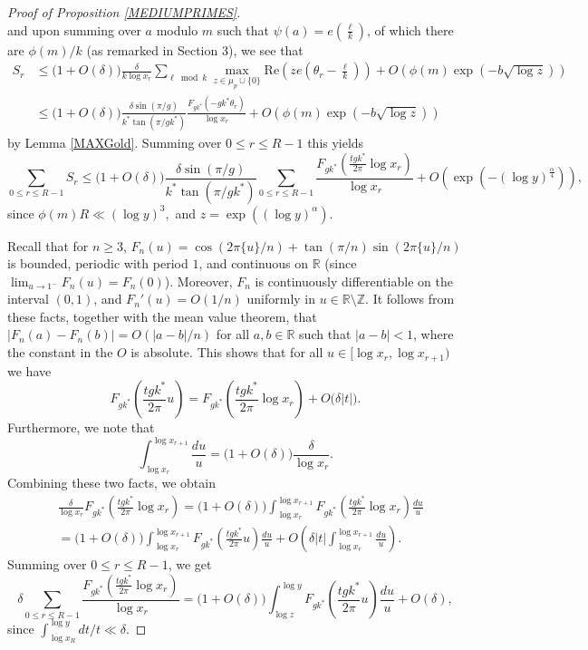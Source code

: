 \documentclass[12pt]{amsart}
\theoremstyle{definition}
\numberwithin{equation}{section}
\begin{document}
\begin{proof}[Proof of Proposition \ref{MEDIUMPRIMES}]
\begin{equation*}
\end{equation*}
and upon summing over $a$ modulo $m$ such that $\psi(a) = e\left(\frac{\ell}{k}\right)$, of which there are $\phi(m)/k$ (as remarked in Section 3), we see that
\begin{align*}
S_r &\leq \big(1+O(\delta)\big)\frac{\delta}{k\log x_r}\sum_{\ell \bmod k} \max_{z \in \mu_p \cup \{0\}} \text{Re}\left(ze\left(\theta_r-\frac{\ell}{k}\right)\right) + O\left(\phi(m)\exp\left(-b\sqrt{\log z}\right)\right)\\
& \leq \big(1+O(\delta)\big)\frac{\delta \sin(\pi/g)}{ k^{\ast}\tan(\pi/gk^{\ast})}\frac{F_{gk^{\ast}}(-gk^{\ast} \theta_r)}{\log x_r}+ O\left(\phi(m)\exp\left(-b\sqrt{\log z}\right)\right)
\end{align*} 
by Lemma \ref{MAXGold}. Summing over $0 \leq r \leq R-1$ this yields
\begin{equation}\label{SPLIT2}
\sum_{0 \leq r \leq R-1} S_r \leq\big(1+O(\delta)\big)\frac{\delta \sin(\pi/g)}{ k^{\ast}\tan(\pi/gk^{\ast})} \sum_{0 \leq r \leq R-1} \frac{F_{gk^{\ast}}\left(\frac{t gk^{\ast}}{2\pi} \log x_r\right)}{\log x_r} +  O\left(\exp\left(-(\log y)^{\frac{\alpha}{4}}\right)\right),
\end{equation} 
since $\phi(m) R\ll (\log y)^3,$ and $z=\exp\left((\log y)^{\alpha}\right).$ 

Recall that for $n\ge 3$, $F_n(u)= \cos(2\pi\{u\}/n) + \tan(\pi/n)\sin(2\pi \{u\}/n)$ is bounded, periodic with period $1$, and continuous on $\mathbb{R}$ (since $\lim_{u\to 1^{-}} F_n(u)=F_n(0)$). Moreover, $F_n$ is continuously differentiable on the interval $(0,1)$, and $F_n'(u) =O(1/n)$ uniformly in $u\in \mathbb{R}\setminus\mathbb{Z}$. It follows from  these facts, together with the mean value theorem, that $|F_n(a)-F_n(b)|=O(|a-b|/n)$ for all $a, b\in \mathbb{R}$ such that $|a-b|<1$, where the constant in the $O$ is absolute. This shows that for all $u\in [\log x_r, \log x_{r+1})$ we have
$$ F_{gk^{\ast}}\left(\frac{t gk^{\ast}}{2\pi} u\right)= F_{gk^{\ast}}\left(\frac{t gk^{\ast}}{2\pi} \log x_r\right) +O\big(\delta|t|\big).$$
Furthermore, we note that
$$\int_{\log x_r}^{\log x_{r+1}}\frac{du}{u}=\big(1+O(\delta)\big)\frac{\delta}{\log x_r}.$$
Combining these two facts, we obtain
\begin{align*}
&\frac{\delta}{\log x_r}F_{gk^{\ast}}\left(\frac{t gk^{\ast}}{2\pi} \log x_r\right)
=\big(1+O(\delta)\big)\int_{\log x_r}^{\log x_{r+1}}F_{gk^{\ast}}\left(\frac{t gk^{\ast}}{2\pi} \log x_r\right)\frac{du}{u}\\
&= \big(1+O(\delta)\big)\int_{\log x_r}^{\log x_{r+1}}F_{gk^{\ast}}\left(\frac{t gk^{\ast}}{2\pi} u\right)\frac{du}{u} +O\left(\delta |t| \int_{\log x_r}^{\log x_{r+1}}\frac{du}{u} \right).
\end{align*}
Summing over $0\leq r\leq R-1$, we get
$$
 \delta\sum_{0\leq r\leq R-1}\frac{F_{gk^{\ast}}\left(\frac{t gk^{\ast}}{2\pi} \log x_r\right)}{\log x_r}
 = \big(1+O(\delta)\big)\int_{\log z}^{\log y}F_{gk^{\ast}}\left(\frac{t gk^{\ast}}{2\pi} u\right)\frac{du}{u} +O\left(\delta\right),
$$
since $\int_{\log x_R}^{\log y} dt/t\ll \delta$. 


\end{proof}
\end{document}
